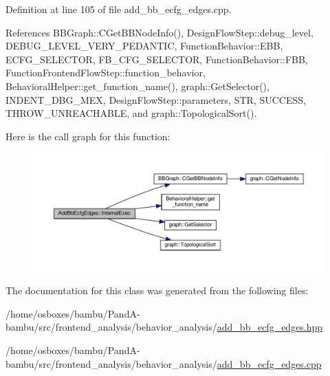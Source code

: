 Definition at line 105 of file add\+\_\+bb\+\_\+ecfg\+\_\+edges.\+cpp.



References B\+B\+Graph\+::\+C\+Get\+B\+B\+Node\+Info(), Design\+Flow\+Step\+::debug\+\_\+level, D\+E\+B\+U\+G\+\_\+\+L\+E\+V\+E\+L\+\_\+\+V\+E\+R\+Y\+\_\+\+P\+E\+D\+A\+N\+T\+IC, Function\+Behavior\+::\+E\+BB, E\+C\+F\+G\+\_\+\+S\+E\+L\+E\+C\+T\+OR, F\+B\+\_\+\+C\+F\+G\+\_\+\+S\+E\+L\+E\+C\+T\+OR, Function\+Behavior\+::\+F\+BB, Function\+Frontend\+Flow\+Step\+::function\+\_\+behavior, Behavioral\+Helper\+::get\+\_\+function\+\_\+name(), graph\+::\+Get\+Selector(), I\+N\+D\+E\+N\+T\+\_\+\+D\+B\+G\+\_\+\+M\+EX, Design\+Flow\+Step\+::parameters, S\+TR, S\+U\+C\+C\+E\+SS, T\+H\+R\+O\+W\+\_\+\+U\+N\+R\+E\+A\+C\+H\+A\+B\+LE, and graph\+::\+Topological\+Sort().

Here is the call graph for this function\+:
\nopagebreak
\begin{figure}[H]
\begin{center}
\leavevmode
\includegraphics[width=350pt]{d8/d78/classAddBbEcfgEdges_a68e4d52d843953b82aa4faf47c2585a1_cgraph}
\end{center}
\end{figure}


The documentation for this class was generated from the following files\+:\begin{DoxyCompactItemize}
\item 
/home/osboxes/bambu/\+Pand\+A-\/bambu/src/frontend\+\_\+analysis/behavior\+\_\+analysis/\hyperlink{add__bb__ecfg__edges_8hpp}{add\+\_\+bb\+\_\+ecfg\+\_\+edges.\+hpp}\item 
/home/osboxes/bambu/\+Pand\+A-\/bambu/src/frontend\+\_\+analysis/behavior\+\_\+analysis/\hyperlink{add__bb__ecfg__edges_8cpp}{add\+\_\+bb\+\_\+ecfg\+\_\+edges.\+cpp}\end{DoxyCompactItemize}

